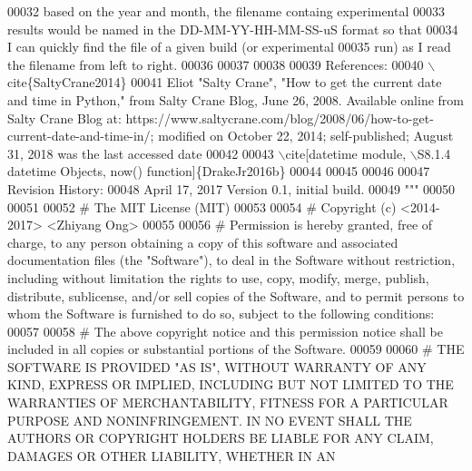 \begin{DoxyCode}
00032 \textcolor{stringliteral}{        based on the year and month, the filename containg experimental}
00033 \textcolor{stringliteral}{        results would be named in the DD-MM-YY-HH-MM-SS-uS format so that}
00034 \textcolor{stringliteral}{        I can quickly find the file of a given build (or experimental}
00035 \textcolor{stringliteral}{        run) as I read the filename from left to right.}
00036 \textcolor{stringliteral}{}
00037 \textcolor{stringliteral}{}
00038 \textcolor{stringliteral}{}
00039 \textcolor{stringliteral}{    References:}
00040 \textcolor{stringliteral}{    \(\backslash\)cite\{SaltyCrane2014\}}
00041 \textcolor{stringliteral}{        Eliot "Salty Crane", "How to get the current date and time in Python," from Salty Crane Blog, June
       26, 2008. Available online from Salty Crane Blog at:
       https://www.saltycrane.com/blog/2008/06/how-to-get-current-date-and-time-in/; modified on October 22, 2014; self-published; August 31, 2018 was the last accessed
       date}
00042 \textcolor{stringliteral}{}
00043 \textcolor{stringliteral}{    \(\backslash\)cite[datetime module, \(\backslash\)S8.1.4 datetime Objects, now() function]\{DrakeJr2016b\}}
00044 \textcolor{stringliteral}{}
00045 \textcolor{stringliteral}{}
00046 \textcolor{stringliteral}{}
00047 \textcolor{stringliteral}{    Revision History:}
00048 \textcolor{stringliteral}{    April 17, 2017          Version 0.1, initial build.}
00049 \textcolor{stringliteral}{"""}
00050 
00051 
00052 \textcolor{comment}{#   The MIT License (MIT)}
00053 
00054 \textcolor{comment}{#   Copyright (c) <2014-2017> <Zhiyang Ong>}
00055 
00056 \textcolor{comment}{#   Permission is hereby granted, free of charge, to any person obtaining a copy of this software and
       associated documentation files (the "Software"), to deal in the Software without restriction, including without
       limitation the rights to use, copy, modify, merge, publish, distribute, sublicense, and/or sell copies of the
       Software, and to permit persons to whom the Software is furnished to do so, subject to the following
       conditions:}
00057 
00058 \textcolor{comment}{#   The above copyright notice and this permission notice shall be included in all copies or substantial
       portions of the Software.}
00059 
00060 \textcolor{comment}{#   THE SOFTWARE IS PROVIDED "AS IS", WITHOUT WARRANTY OF ANY KIND, EXPRESS OR IMPLIED, INCLUDING BUT NOT
       LIMITED TO THE WARRANTIES OF MERCHANTABILITY, FITNESS FOR A PARTICULAR PURPOSE AND NONINFRINGEMENT. IN NO
       EVENT SHALL THE AUTHORS OR COPYRIGHT HOLDERS BE LIABLE FOR ANY CLAIM, DAMAGES OR OTHER LIABILITY, WHETHER IN AN
}
\end{DoxyCode}
